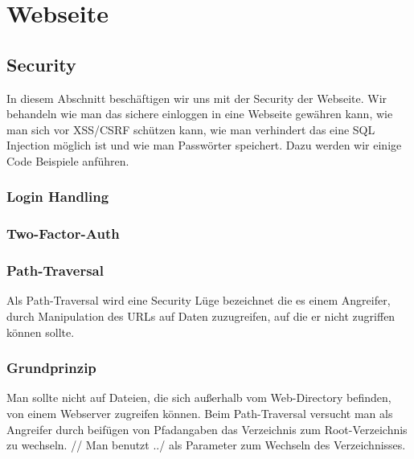 
\section{Webseite}
\label{sec:Webseite}
\subsection{Security}
\label{sec:Security}
In diesem Abschnitt beschäftigen wir uns mit der Security der Webseite.
Wir behandeln wie man das sichere einloggen in eine Webseite gewähren kann, 
wie man sich vor XSS/CSRF schützen kann, wie man verhindert das eine SQL Injection
möglich ist und wie man Passwörter speichert. Dazu werden wir einige Code Beispiele anführen.

\subsubsection{Login Handling}
\label{sec:Login}
\subsubsection{Two-Factor-Auth}
\label{sec:tfa}
\subsubsection{Path-Traversal}
\label{sec:Path-Traversal}
Als Path-Traversal wird eine Security Lüge bezeichnet die es einem Angreifer, durch Manipulation des URLs auf Daten zuzugreifen, auf die er nicht zugriffen können sollte. 
\subsubsection{Grundprinzip}
Man sollte nicht auf Dateien, die sich außerhalb vom Web-Directory befinden, von einem Webserver zugreifen können. Beim Path-Traversal versucht man als Angreifer durch beifügen von Pfadangaben das Verzeichnis zum Root-Verzeichnis zu wechseln. 
//
Man benutzt ../ als Parameter zum Wechseln des Verzeichnisses.
